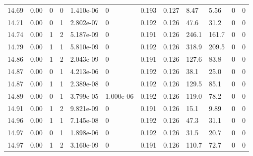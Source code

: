 \documentclass[preview]{standalone}
\begin{document}
{{{{{{{{{{{\begin{tabular}{L{1.2cm}C{1.2cm} C{0.3cm}C{0.5cm} C{1.4cm}C{1.4cm} C{1.4cm}C{1.4cm} C{1.6cm}C{1.6cm} C{1.6cm}C{1.6cm}}
  14.69  &  0.00  & 0     &  0 &  1.410e-06  & 0  &  0.193&   0.127& 8.47 & 5.56   &  0 & 0  \\ 
  14.71  &  0.00  & 0     &  1 &  2.802e-07  & 0  &  0.192&   0.126& 47.6 & 31.2   &  0 & 0  \\ 
  14.74  &  0.00  & 1     &  2 &  5.187e-09  & 0  &  0.191&   0.126& 246.1 & 161.7   &  0 & 0  \\ 
  14.79  &  0.00  & 1     &  1 &  5.810e-09  & 0  &  0.192&   0.126& 318.9 & 209.5   &  0 & 0  \\ 
  14.86  &  0.00  & 1     &  2 &  2.043e-09  & 0  &  0.191&   0.126& 127.6 & 83.8   &  0 & 0  \\ 
  14.87  &  0.00  & 0     &  1 &  4.213e-06  & 0  &  0.192&   0.126& 38.1 & 25.0   &  0 & 0  \\ 
  14.87  &  0.00  & 1     &  1 &  2.389e-08  & 0  &  0.192&   0.126& 129.5 & 85.1   &  0 & 0  \\ 
  14.89  &  0.00  & 0     &  1 &  3.799e-05  & 1.000e-06  &  0.192&   0.126& 119.0 & 78.2   &  0 & 0  \\ 
  14.91  &  0.00  & 1     &  2 &  9.821e-09  & 0  &  0.191&   0.126& 15.1 & 9.89   &  0 & 0  \\ 
  14.96  &  0.00  & 1     &  1 &  7.145e-08  & 0  &  0.192&   0.126& 47.3 & 31.1   &  0 & 0  \\ 
  14.97  &  0.00  & 0     &  1 &  1.898e-06  & 0  &  0.192&   0.126& 31.5 & 20.7   &  0 & 0  \\ 
  14.97  &  0.00  & 1     &  2 &  3.160e-09  & 0  &  0.191&   0.126& 110.7 & 72.7   &  0 & 0  \\ 
\hline 
\end{tabular} 

}}}}}}}}}}}
\end{document}
